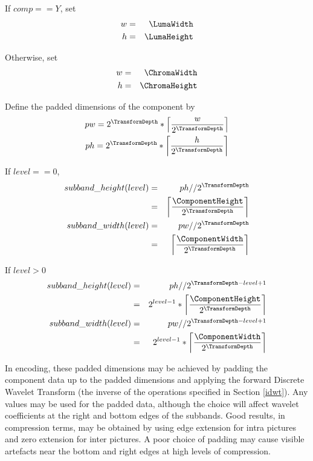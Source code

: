 If $comp==Y$, set
\begin{eqnarray*}
w & = & \LumaWidth \\
h & = & \LumaHeight
\end{eqnarray*}

Otherwise, set
\begin{eqnarray*}
w & = & \ChromaWidth \\
h & = & \ChromaHeight
\end{eqnarray*}

Define the padded dimensions of the component by
\begin{eqnarray*}
pw = 2^{\TransformDepth}*\left\lceil\frac{w}{2^{\TransformDepth}}\right\rceil\\ 
ph = 2^{\TransformDepth}*\left\lceil\frac{h}{2^{\TransformDepth}}\right\rceil
\end{eqnarray*}

If $level==0$,
\begin{eqnarray*}
subband\_height(level) & = & ph//2^{\TransformDepth} \\
& = & \left\lceil\frac{\ComponentHeight}{2^{\TransformDepth}}\right\rceil \\
subband\_width(level) & = & pw//2^{\TransformDepth} \\
& = & \left\lceil\frac{\ComponentWidth}{2^{\TransformDepth}}\right\rceil
\end{eqnarray*}

If $level>0$
\begin{eqnarray*}
subband\_height(level) & = & ph//2^{\TransformDepth-level+1} \\
& = & 2^{level-1}*\left\lceil\frac{\ComponentHeight}{2^{\TransformDepth}}\right\rceil \\
subband\_width(level) & = & pw//2^{\TransformDepth-level+1} \\
& = & 2^{level-1}*\left\lceil \frac{\ComponentWidth}{2^{\TransformDepth}}\right\rceil
\end{eqnarray*}

\begin{informative}
In encoding, these padded dimensions may be achieved by padding the 
component data up to the padded dimensions and applying the forward
Discrete Wavelet Transform (the inverse of the operations specified in
Section \ref{idwt}). Any values may be used for the padded data, although
the choice will affect wavelet coefficients at the right and bottom 
edges of the subbands. Good results, in compression terms, may be obtained
 by using edge extension for intra pictures and zero extension for inter 
pictures. A poor choice of padding may cause visible artefacts near the
bottom and right edges at high levels of compression.
\end{informative}

